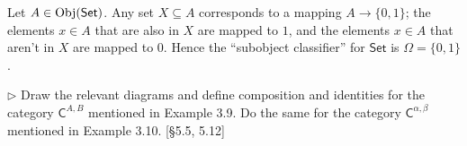 \begin{solution}
	\def \C {\mathsf{C}}
	\def \Set {\mathsf{Set}}
	
	Let $A\in\Obj(\Set)$. Any set $X\subseteq A$ corresponds to a mapping
	$A\to\{0,1\}$; the elements $x\in A$ that are also in $X$ are mapped to $1$, and
	the elements $x\in A$ that aren't in $X$ are mapped to $0$. Hence the
	``subobject classifier'' for $\Set$ is $\Omega=\{0,1\}$.
\end{solution}


\begin{problem}[3.11]
	$\rhd$ Draw the relevant diagrams and define composition and identities for the
	category $\mathsf{C}^{A,B}$ mentioned in Example 3.9. Do the same for the category
	$\mathsf{C}^{\alpha,\beta}$ mentioned in Example 3.10. [\S5.5, 5.12]
\end{problem}
